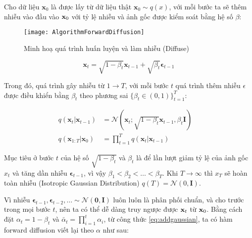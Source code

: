 Cho dữ liệu $\mathbf{x}_{0}$ là được lấy từ dữ liệu thật $\mathbf{x}_{0} \sim q(x)$, với mỗi bước ta sẽ thêm nhiễu vào đầu vào $\mathbf{x}_{0}$ với tỷ lệ nhiễu và ảnh gốc được kiểm soát bằng hệ số $\beta$:
\vspace{-20pt}
\setcounter{figure}{5}
\begin{figure*}[H]
	\centering
	\texttt{[image: AlgorithmForwardDiffusion]}
	\vspace{-5pt}
	\caption{Minh hoạ quá trình huấn luyện và làm nhiễu (Diffuse)}
	\label{fig:AlgorithmForwardDiffusion}
	\vspace{-10pt}
\end{figure*}


\begin{equation}
	\label{eq:addgaussian}
	\mathbf{x}_t = \sqrt{1 - \beta_t}\mathbf{x}_{t-1} + \sqrt{\beta_t} \boldsymbol{\epsilon}_{t-1}
\end{equation}

Trong đó, quá trình gây nhiễu từ $1 \to T$, với mỗi bước $t$ quá trình thêm nhiễu $\epsilon$ được điều khiển bằng $\beta_t$ theo phương sai $\{\beta_t \in (0, 1)\}_{t=1}^T$:

\begin{equation}
	\label{eq:forward_diffusion_process}
	\begin{aligned}
		q(\mathbf{x}_t \vert \mathbf{x}_{t-1}) &= \mathcal{N}(\mathbf{x}_t; \sqrt{1 - \beta_t} \mathbf{x}_{t-1}, \beta_t\mathbf{I}) \quad \\
		q(\mathbf{x}_{1:T} \vert \mathbf{x}_0) &= \prod^T_{t=1} q(\mathbf{x}_t \vert \mathbf{x}_{t-1})
	\end{aligned}
\end{equation}

Mục tiêu ở bước $t$ của hệ số $\sqrt{1 - \beta_t}$ và $\beta_t$ là để lần lượt giảm tỷ lệ của ảnh gốc $x_t$ và tăng dần nhiễu  $\boldsymbol{\epsilon}_{t-1}$, vì vậy $\beta_1 < \beta_2 < \dots < \beta_T$. Khi $T \to \infty$ thì $x_{T}$ sẽ hoàn toàn nhiễu \cite{weng2021diffusion} (Isotropic Gaussian Distribution) $q(T) = \mathcal{N} (0, \mathbf{I})$.


Vì nhiễu $\boldsymbol{\epsilon}_{t-1}, \boldsymbol{\epsilon}_{t-2}, \dots \sim \mathcal{N}(\mathbf{0}, \mathbf{I})$ luôn luôn là phân phối chuẩn, và cho trước trong mọi bước $t$, nên ta có thể dễ dàng truy ngược được $\mathbf{x}_t$ từ $\mathbf{x}_0$. Bằng cách đặt $\alpha_t = 1 - \beta_t$ và $\bar{\alpha}_t = \prod_{i=1}^t \alpha_i$, từ công thức \ref{eq:addgaussian}, ta có hàm forward diffusion viết lại theo $\alpha$ như sau:

